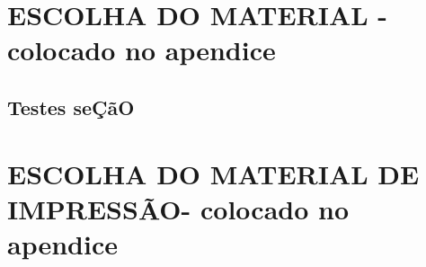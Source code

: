    \label{ap:ap01}
   \chapter{ESCOLHA DO MATERIAL - colocado no apendice}
    
   \lipsum[30] %
   \section*{Testes se\c{C}\~aO}

    \lipsum[22] %
	
	\chapter{ESCOLHA DO MATERIAL DE IMPRESSÃO- colocado no apendice}
    \lipsum[32] %
